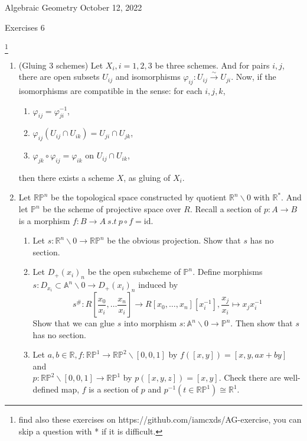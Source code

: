 \documentclass[a4paper,11pt]{article}
\def\bb#1{\mathbb{#1}}
\def\mrm#1{\mathrm{#1}}
\begin{document}
{\small Algebraic Geometry \hfill October 12, 2022 \\}
\begin{center}
\Huge Exercises 6
\end{center}

\vskip0.6cm
\footnote{find also these exercises on https://github.com/iamcxds/AG-exercise, you can skip a question with * if it is difficult.}

\begin{enumerate}[1.]
\item (Gluing 3 schemes) Let $X_i, i=1,2,3$ be three schemes. And for pairs $i,j$, there are open subsets $U_{ij}$ and isomorphisms $\varphi_{ij}:U_{ij}\overset {\sim }{\to} U_{ji}$. Now, if the isomorphisms are compatible in the sense: for each $i,j,k$,
\begin{enumerate}[(1)]
    \item $\varphi_{ij}=\varphi_{ji}^{-1}$,
    \item $\varphi_{ij}(U_{ij}\cap U_{ik})=U_{ji}\cap U_{jk}$,
    \item $\varphi_{jk}\circ \varphi_{ij}=\varphi_{ik}$ on $U_{ij}\cap U_{ik}$,
\end{enumerate}
then there exists a scheme $X$, as gluing of $X_i$.
\item Let $\bb{R}\bb{P}^n$ be the topological space constructed by quotient $\bb{R}^n\backslash 0$ with $\bb{R}^*$. And let $\bb{P}^n$ be the scheme of projective space over $R$. Recall a section of $p:A\to B$ is a morphism $f:B\to A \ s.t \ p\circ f =\mrm{id}$.
\begin{enumerate}
    \item Let $s:\bb{R}^n\backslash 0 \to \bb{R}\bb{P}^n$ be the obvious projection. Show that $s$ has no section.
    \item Let $D_+(x_i)_n$ be the open subscheme of $\bb{P}^n$. Define  morphisms $s: D_{x_i}\subset \bb{A}^n\backslash 0 \to D_+(x_i)_n$ induced by 
    \[ s^\#: R[\frac{x_0}{x_i},\ldots \frac{x_n}{x_i}]\to R[x_0,\ldots,x_n][x_i^{-1}],  \frac{x_j}{x_i} \mapsto x_jx_i^{-1}\]
    Show that we can glue $s$ into morphism $s: \bb{A}^n\backslash 0 \to \bb{P}^n$. Then show that $s$ has no section.
    \item Let $a,b \in \bb{R}, f:\bb{R}\bb{P}^1\to \bb{R}\bb{P}^2\backslash[0,0,1] $ by $f([x,y])=[x,y,ax+by]$ and
    \\ $p:\bb{R}\bb{P}^2\backslash[0,0,1]\to\bb{R}\bb{P}^1$ by $p([x,y,z])=[x,y]$. Check there are well-defined map, $f$ is a section of $p$ and $p^{-1}(t\in \bb{R}\bb{P}^1)\cong \bb{R}^1$. 

\end{enumerate}
\end{enumerate}
\end{document}
